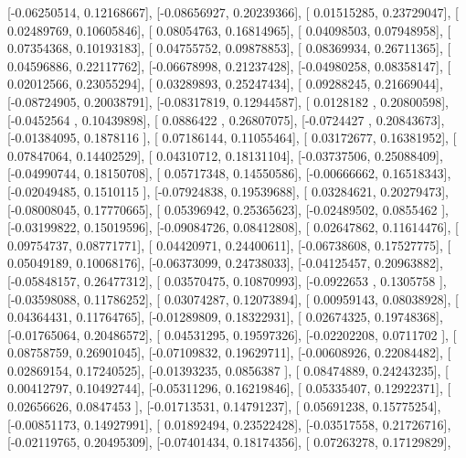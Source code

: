 \documentclass{article}
\begin{document}
       [-0.06250514,  0.12168667],
       [-0.08656927,  0.20239366],
       [ 0.01515285,  0.23729047],
       [ 0.02489769,  0.10605846],
       [ 0.08054763,  0.16814965],
       [ 0.04098503,  0.07948958],
       [ 0.07354368,  0.10193183],
       [ 0.04755752,  0.09878853],
       [ 0.08369934,  0.26711365],
       [ 0.04596886,  0.22117762],
       [-0.06678998,  0.21237428],
       [-0.04980258,  0.08358147],
       [ 0.02012566,  0.23055294],
       [ 0.03289893,  0.25247434],
       [ 0.09288245,  0.21669044],
       [-0.08724905,  0.20038791],
       [-0.08317819,  0.12944587],
       [ 0.0128182 ,  0.20800598],
       [-0.0452564 ,  0.10439898],
       [ 0.0886422 ,  0.26807075],
       [-0.0724427 ,  0.20843673],
       [-0.01384095,  0.1878116 ],
       [ 0.07186144,  0.11055464],
       [ 0.03172677,  0.16381952],
       [ 0.07847064,  0.14402529],
       [ 0.04310712,  0.18131104],
       [-0.03737506,  0.25088409],
       [-0.04990744,  0.18150708],
       [ 0.05717348,  0.14550586],
       [-0.00666662,  0.16518343],
       [-0.02049485,  0.1510115 ],
       [-0.07924838,  0.19539688],
       [ 0.03284621,  0.20279473],
       [-0.08008045,  0.17770665],
       [ 0.05396942,  0.25365623],
       [-0.02489502,  0.0855462 ],
       [-0.03199822,  0.15019596],
       [-0.09084726,  0.08412808],
       [ 0.02647862,  0.11614476],
       [ 0.09754737,  0.08771771],
       [ 0.04420971,  0.24400611],
       [-0.06738608,  0.17527775],
       [ 0.05049189,  0.10068176],
       [-0.06373099,  0.24738033],
       [-0.04125457,  0.20963882],
       [-0.05848157,  0.26477312],
       [ 0.03570475,  0.10870993],
       [-0.0922653 ,  0.1305758 ],
       [-0.03598088,  0.11786252],
       [ 0.03074287,  0.12073894],
       [ 0.00959143,  0.08038928],
       [ 0.04364431,  0.11764765],
       [-0.01289809,  0.18322931],
       [ 0.02674325,  0.19748368],
       [-0.01765064,  0.20486572],
       [ 0.04531295,  0.19597326],
       [-0.02202208,  0.0711702 ],
       [ 0.08758759,  0.26901045],
       [-0.07109832,  0.19629711],
       [-0.00608926,  0.22084482],
       [ 0.02869154,  0.17240525],
       [-0.01393235,  0.0856387 ],
       [ 0.08474889,  0.24243235],
       [ 0.00412797,  0.10492744],
       [-0.05311296,  0.16219846],
       [ 0.05335407,  0.12922371],
       [ 0.02656626,  0.0847453 ],
       [-0.01713531,  0.14791237],
       [ 0.05691238,  0.15775254],
       [-0.00851173,  0.14927991],
       [ 0.01892494,  0.23522428],
       [-0.03517558,  0.21726716],
       [-0.02119765,  0.20495309],
       [-0.07401434,  0.18174356],
       [ 0.07263278,  0.17129829],
\end{document}
